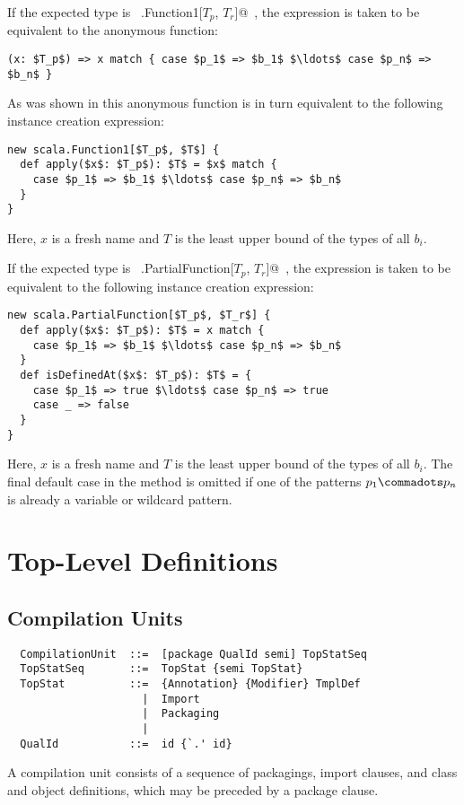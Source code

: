 If the expected type is ~\lstinline@scala.Function1[$T_p$, $T_r$]@~,
the expression is taken to be equivalent to the anonymous function:
\begin{lstlisting}
(x: $T_p$) => x match { case $p_1$ => $b_1$ $\ldots$ case $p_n$ => $b_n$ }
\end{lstlisting}
As was shown in  this anonymous function is in turn
equivalent to the following instance creation expression:
\begin{lstlisting}
new scala.Function1[$T_p$, $T$] {
  def apply($x$: $T_p$): $T$ = $x$ match {
    case $p_1$ => $b_1$ $\ldots$ case $p_n$ => $b_n$
  }
}
\end{lstlisting}
Here, $x$ is a fresh name and $T$ is the least upper bound of the
types of all $b_i$.

If the expected type is ~\lstinline@scala.PartialFunction[$T_p$, $T_r$]@~,
the expression is taken to be equivalent to the following instance creation expression:
\begin{lstlisting}
new scala.PartialFunction[$T_p$, $T_r$] {
  def apply($x$: $T_p$): $T$ = x match {
    case $p_1$ => $b_1$ $\ldots$ case $p_n$ => $b_n$
  }
  def isDefinedAt($x$: $T_p$): $T$ = {
    case $p_1$ => true $\ldots$ case $p_n$ => true
    case _ => false
  }
}
\end{lstlisting}
Here, $x$ is a fresh name and $T$ is the least upper bound of the
types of all $b_i$. The final default case in the 
method is omitted if one of the patterns $p_1 \commadots p_n$ is
already a variable or wildcard pattern.

\chapter{Top-Level Definitions}
\label{sec:topdefs}

\section{Compilation Units}

\syntax\begin{lstlisting}
  CompilationUnit  ::=  [package QualId semi] TopStatSeq
  TopStatSeq       ::=  TopStat {semi TopStat}
  TopStat          ::=  {Annotation} {Modifier} TmplDef
                     |  Import
                     |  Packaging
                     |
  QualId           ::=  id {`.' id}
\end{lstlisting}

A compilation unit consists of a sequence of packagings, import
clauses, and class and object definitions, which may be preceded by a
package clause.

